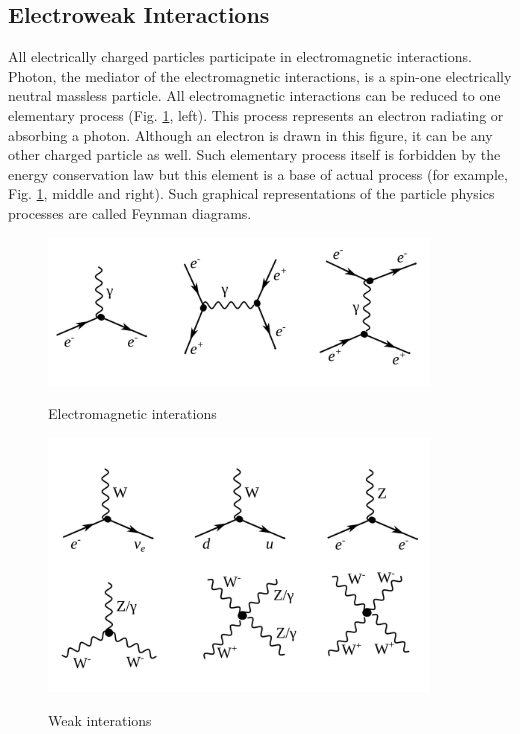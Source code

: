 \subsection{Electroweak Interactions}
\label{sec:Intro_Electroweak}




All electrically charged particles participate in electromagnetic interactions. Photon, the mediator of the electromagnetic interactions, is a spin-one electrically neutral massless particle. All electromagnetic interactions can be reduced to one elementary process (Fig. \ref{fig:feynmEM}, left). This process represents an electron radiating or absorbing a photon. Although an electron is drawn in this figure, it can be any other charged particle as well. Such elementary process itself is forbidden by the energy conservation law but this element is a base of actual process (for example, Fig. \ref{fig:feynmEM}, middle and right). Such graphical representations of the particle physics processes are called Feynman diagrams.\\ 

\begin{figure}[htb]
  \begin{center}
    {\includegraphics[width=0.90\textwidth]{../figs/Intro/feynmEM.png}}
    \caption{Electromagnetic interations}
    \label{fig:feynmEM}
  \end{center}
\end{figure}

\begin{figure}[htb]
  \begin{center}
    {\includegraphics[width=0.90\textwidth]{../figs/Intro/feynmW.png}}
    \caption{Weak interations}
    \label{fig:feynmW}
  \end{center}
\end{figure}


